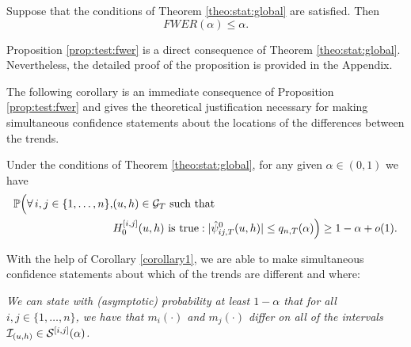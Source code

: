 \documentclass[a4paper,12pt]{article}
\begin{document}
\begin{prop}\label{prop:test:fwer}
Suppose that the conditions  of Theorem \ref{theo:stat:global} are satisfied. Then 
\[ FWER(\alpha) \leq \alpha. \]
\end{prop}

Proposition \ref{prop:test:fwer} is a direct consequence of Theorem \ref{theo:stat:global}. Nevertheless, the detailed proof of the proposition is provided in the 
Appendix. 

The following corollary is an immediate consequence of Proposition \ref{prop:test:fwer} and gives the theoretical justification necessary for making simultaneous confidence statements about the locations of the differences between the trends.

\begin{corollary}\label{corollary1}
Under the conditions of Theorem \ref{theo:stat:global}, for any given $\alpha \in (0,1)$ we have
\begin{align*}\mathbb{P}\Big( \forall \, i,j \in \{1, \ldots, n\}, &(u, h) \in \mathcal{G}_T \text{ such that }\\
&H_0^{[i, j]}(u, h) \text{ is true}: |\hat{\psi}^0_{ij,T}(u, h)| \le q_{n,T}(\alpha) \Big) \ge 1 - \alpha + o(1).
\end{align*}
\end{corollary} 


With the help of Corollary \ref{corollary1}, we are able to make simultaneous confidence statements about which of the trends are different and where:

\begin{center}
\begin{minipage}[c][1.75cm][c]{13cm}
\textit{We can state with (asymptotic) probability at least $1-\alpha$ that for all \linebreak $i, j \in \{1,\ldots, n\}$, we have that $m_i(\cdot)$ and $m_j(\cdot)$ differ on all of the intervals $\mathcal{I}_{(u, h)} \in \mathcal{S}^{[i, j]}(\alpha)$.}
\end{minipage}
\end{center}
\end{document}
